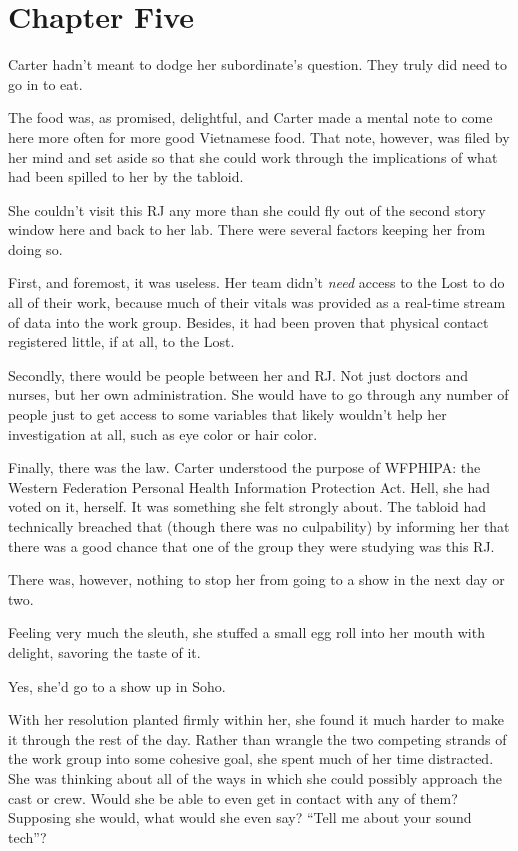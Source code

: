 \chapter*{Chapter Five}

Carter hadn't meant to dodge her subordinate's question.  They truly did need to go in to eat.

The food was, as promised, delightful, and Carter made a mental note to come here more often for more good Vietnamese food.  That note, however, was filed by her mind and set aside so that she could work through the implications of what had been spilled to her by the tabloid.

She couldn't visit this RJ any more than she could fly out of the second story window here and back to her lab.  There were several factors keeping her from doing so.

First, and foremost, it was useless.  Her team didn't \textit{need} access to the Lost to do all of their work, because much of their vitals was provided as a real-time stream of data into the work group.  Besides, it had been proven that physical contact registered little, if at all, to the Lost.

Secondly, there would be people between her and RJ.  Not just doctors and nurses, but her own administration.  She would have to go through any number of people just to get access to some variables that likely wouldn't help her investigation at all, such as eye color or hair color.

Finally, there was the law.  Carter understood the purpose of WFPHIPA: the Western Federation Personal Health Information Protection Act.  Hell, she had voted on it, herself.  It was something she felt strongly about.  The tabloid had technically breached that (though there was no culpability) by informing her that there was a good chance that one of the group they were studying was this RJ.

There was, however, nothing to stop her from going to a show in the next day or two.

Feeling very much the sleuth, she stuffed a small egg roll into her mouth with delight, savoring the taste of it.

Yes, she'd go to a show up in Soho.

\secdiv

With her resolution planted firmly within her, she found it much harder to make it through the rest of the day.  Rather than wrangle the two competing strands of the work group into some cohesive goal, she spent much of her time distracted.  She was thinking about all of the ways in which she could possibly approach the cast or crew.  Would she be able to even get in contact with any of them?  Supposing she would, what would she even say?  ``Tell me about your sound tech''?

